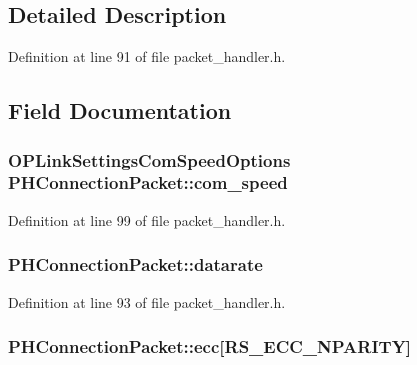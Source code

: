 \subsection{Detailed Description}


Definition at line 91 of file packet\-\_\-handler.\-h.



\subsection{Field Documentation}
\hypertarget{struct_p_h_connection_packet_aba21090aa4d393dc1d6e85406efa1c4b}{
\subsubsection[{com\-\_\-speed}]{\setlength{\rightskip}{0pt plus 5cm}O\-P\-Link\-Settings\-Com\-Speed\-Options P\-H\-Connection\-Packet\-::com\-\_\-speed}}\label{struct_p_h_connection_packet_aba21090aa4d393dc1d6e85406efa1c4b}


Definition at line 99 of file packet\-\_\-handler.\-h.

\hypertarget{struct_p_h_connection_packet_ac0efb46843892dc7b42a503eeea6d58c}{
\subsubsection[{datarate}]{ P\-H\-Connection\-Packet\-::datarate}}\label{struct_p_h_connection_packet_ac0efb46843892dc7b42a503eeea6d58c}


Definition at line 93 of file packet\-\_\-handler.\-h.

\hypertarget{struct_p_h_connection_packet_a047b7d5ea9d5699d06966d96ef4ccfba}{
\subsubsection[{ecc}]{ P\-H\-Connection\-Packet\-::ecc\mbox{[}R\-S\-\_\-\-E\-C\-C\-\_\-\-N\-P\-A\-R\-I\-T\-Y\mbox{]}}}\label{struct_p_h_connection_packet_a047b7d5ea9d5699d06966d96ef4ccfba}



